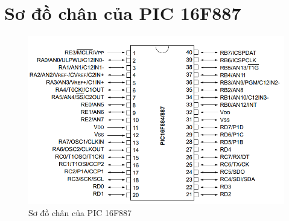 \section*{Sơ đồ chân của PIC 16F887}
\begin{figure}[!h]
\begin{center}
\includegraphics[scale=1]{image/PIC16F887}
\end{center}
\caption{Sơ đồ chân của PIC 16F887}
\end{figure}
